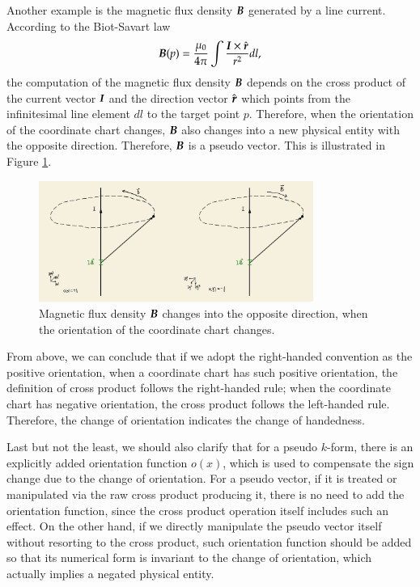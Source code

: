 \documentclass[11pt, a4paper]{book}
\begin{document}
Another example is the magnetic flux density $\boldsymbol{B}$ generated by a line current.
According to the Biot-Savart law \citep[see][page 215]{GriffithsIntroduction1999}
\begin{equation}
  \boldsymbol{B}(p) = \frac{\mu_0}{4\pi} \int \frac{\boldsymbol{I} \times \hat{\boldsymbol{r}}}{r^2} dl,
\end{equation}
the computation of the magnetic flux density $\boldsymbol{B}$ depends on the cross product of
the current vector $\boldsymbol{I}$ and the direction vector $\hat{\boldsymbol{r}}$ which points from
the infinitesimal line element $dl$ to the target point $p$. Therefore, when the
orientation of the coordinate chart changes, $\boldsymbol{B}$ also changes into a new physical
entity with the opposite direction. Therefore, $\boldsymbol{B}$ is a pseudo vector. This is
illustrated in Figure \ref{fig:magnetic-flux-density-as-pseudo-vector}.
\begin{figure}[htbp]
  \centering
  \includegraphics[width=0.8\textwidth, height=\textheight, keepaspectratio]{figures/2023-12-27-magnetic-flux-density-is-pseudo-vector}
  \caption{Magnetic flux density $\boldsymbol{B}$ changes into the opposite direction, when the
    orientation of the coordinate chart changes.}
  \label{fig:magnetic-flux-density-as-pseudo-vector}
\end{figure}

From above, we can conclude that if we adopt the right-handed convention as the positive
orientation, when a coordinate chart has such positive orientation, the definition of
cross product follows the right-handed rule; when the coordinate chart has negative
orientation, the cross product follows the left-handed rule. Therefore, the change of
orientation indicates the change of handedness.

Last but not the least, we should also clarify that for a pseudo $k$-form, there is an
explicitly added orientation function $o(x)$, which is used to compensate the sign change
due to the change of orientation. For a pseudo vector, if it is treated or manipulated via
the raw cross product producing it, there is no need to add the orientation function,
since the cross product operation itself includes such an effect. On the other hand, if we
directly manipulate the pseudo vector itself without resorting to the cross product, such
orientation function should be added so that its numerical form is invariant to the change
of orientation, which actually implies a negated physical entity.
\end{document}
